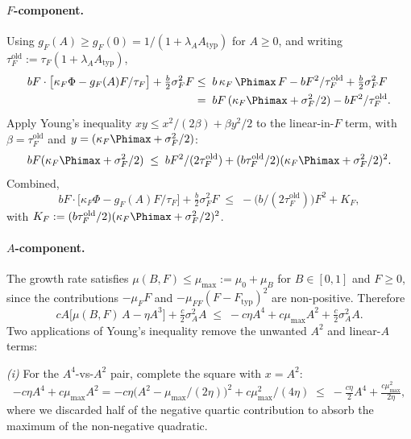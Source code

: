 \paragraph{$F$-component.} Using $g_F(A) \ge g_F(0) = 1/(1+\lambda_A A_{\mathrm{typ}})$
for $A \ge 0$, and writing $\tau_F^{\mathrm{old}} := \tau_F(1+\lambda_A A_{\mathrm{typ}})$,
\begin{align*}
  bF \cdot \bigl[\kappa_F\Phi - g_F(A)F/\tau_F\bigr]
   + \tfrac{b}{2}\sigma_F^2 F
  &\le \;b\,\kappa_F\,\Phimax\,F - bF^2/\tau_F^{\mathrm{old}} + \tfrac{b}{2}\sigma_F^2 F \\
  &= \; b F\,(\kappa_F\Phimax + \sigma_F^2/2) - bF^2/\tau_F^{\mathrm{old}}.
\end{align*}
Apply Young's inequality $xy \le x^2/(2\beta) + \beta y^2/2$ to the
linear-in-$F$ term, with $\beta = \tau_F^{\mathrm{old}}$ and
$y = (\kappa_F\Phimax + \sigma_F^2/2)$:
\[
  b F (\kappa_F\Phimax + \sigma_F^2/2)
   \;\le\; bF^2/(2\tau_F^{\mathrm{old}})
           + (b\tau_F^{\mathrm{old}}/2)(\kappa_F\Phimax + \sigma_F^2/2)^2.
\]
Combined,
\[
  bF \cdot \bigl[\kappa_F\Phi - g_F(A)F/\tau_F\bigr] + \tfrac{b}{2}\sigma_F^2 F
   \;\le\; -\bigl(b/(2\tau_F^{\mathrm{old}})\bigr)F^2 + K_F,
\]
with $K_F := (b\tau_F^{\mathrm{old}}/2)(\kappa_F\Phimax + \sigma_F^2/2)^2$.

\paragraph{$A$-component.} The growth rate satisfies
$\mu(B,F) \le \mu_{\max} := \mu_0 + \mu_B$ for $B \in [0,1]$ and
$F \ge 0$, since the contributions $-\mu_F F$ and
$-\mu_{FF}(F-F_{\mathrm{typ}})^2$ are non-positive. Therefore
\begin{equation*}
  cA\bigl[\mu(B,F)\,A - \eta A^3\bigr] + \tfrac{c}{2}\sigma_A^2 A
   \;\le\; -c\eta A^4 + c\mu_{\max} A^2 + \tfrac{c}{2}\sigma_A^2 A.
\end{equation*}
Two applications of Young's inequality remove the unwanted $A^2$
and linear-$A$ terms:

\emph{(i)} For the $A^4$-vs-$A^2$ pair, complete the square with
$x = A^2$:
\[
  -c\eta A^4 + c\mu_{\max} A^2
   = -c\eta\bigl(A^2 - \mu_{\max}/(2\eta)\bigr)^2 + c\mu_{\max}^2/(4\eta)
   \;\le\; -\tfrac{c\eta}{2}A^4 + \tfrac{c\mu_{\max}^2}{2\eta},
\]
where we discarded half of the negative quartic contribution to
absorb the maximum of the non-negative quadratic.

